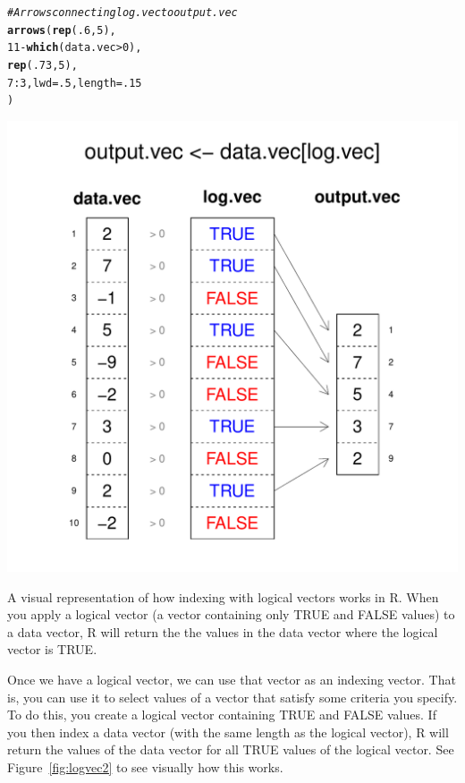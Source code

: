 \documentclass{tufte-book}\usepackage[]{graphicx}\usepackage[]{color}
\makeatletter
\def\maxwidth{ %
  \ifdim\Gin@nat@width>\linewidth
    \linewidth
  \else
    \Gin@nat@width
  \fi
}
\newcommand{\hlnum}[1]{\textcolor[rgb]{0.686,0.059,0.569}{#1}}%
\newcommand{\hlcom}[1]{\textcolor[rgb]{0.678,0.584,0.686}{\textit{#1}}}%
\newcommand{\hlopt}[1]{\textcolor[rgb]{0,0,0}{#1}}%
\newcommand{\hlstd}[1]{\textcolor[rgb]{0.345,0.345,0.345}{#1}}%
\newcommand{\hlkwc}[1]{\textcolor[rgb]{0.333,0.667,0.333}{#1}}%
\newcommand{\hlkwd}[1]{\textcolor[rgb]{0.737,0.353,0.396}{\textbf{#1}}}%
\newenvironment{kframe}{%
 \def\at@end@of@kframe{}%
 \ifinner\ifhmode%
  \def\at@end@of@kframe{\end{minipage}}%
  \begin{minipage}{\columnwidth}%
 \fi\fi%
 \def\FrameCommand##1{\hskip\@totalleftmargin \hskip-\fboxsep
 \colorbox{shadecolor}{##1}\hskip-\fboxsep
     \hskip-\linewidth \hskip-\@totalleftmargin \hskip\columnwidth}%
 \MakeFramed {\advance\hsize-\width
   \@totalleftmargin\z@ \linewidth\hsize
   \@setminipage}}%
 {\par\unskip\endMakeFramed%
 \at@end@of@kframe}
\newenvironment{knitrout}{}{} %
\makeatother
\begin{document}
\begin{marginfigure}
\begin{tiny}
\begin{knitrout}
\begin{kframe}
\begin{alltt}
\hlcom{# Arrows connecting log.vec to output.vec}
\hlkwd{arrows}\hlstd{(}\hlkwd{rep}\hlstd{(}\hlnum{.6}\hlstd{,} \hlnum{5}\hlstd{),}
       \hlnum{11} \hlopt{-} \hlkwd{which}\hlstd{(data.vec} \hlopt{>} \hlnum{0}\hlstd{),}
       \hlkwd{rep}\hlstd{(}\hlnum{.73}\hlstd{,} \hlnum{5}\hlstd{),}
       \hlnum{7}\hlopt{:}\hlnum{3}\hlstd{,} \hlkwc{lwd} \hlstd{=} \hlnum{.5}\hlstd{,} \hlkwc{length} \hlstd{=} \hlnum{.15}
       \hlstd{)}
\end{alltt}
\end{kframe}
\includegraphics[width=\maxwidth]{figure/unnamed-chunk-87-1} 

\end{knitrout}
\end{tiny}
\label{fig:logvec2}
\caption{A visual representation of how indexing with logical vectors works in R. When you apply a logical vector (a vector containing only TRUE and FALSE values) to a data vector, R will return the the values in the data vector where the logical vector is TRUE.}
\end{marginfigure}

Once we have a logical vector, we can use that vector as an indexing vector. That is, you can use it to select values of a vector that satisfy some criteria you specify. To do this, you create a logical vector containing TRUE and FALSE values. If you then index a data vector (with the same length as the logical vector), R will return the values of the data vector for all TRUE values of the logical vector. See Figure~\ref{fig:logvec2} to see visually how this works.
\end{document}
